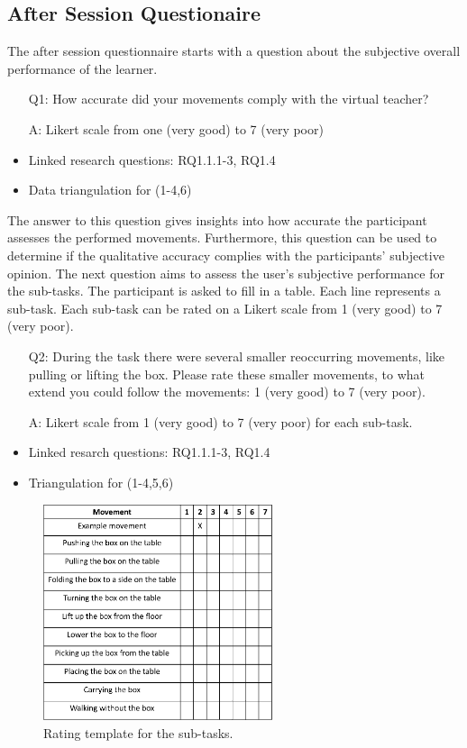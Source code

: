 \subsection{After Session Questionaire}
The after session questionnaire starts with a question about the subjective overall performance of the learner. 
\begin{itemize}
	\item[Q1:] How accurate did your movements comply with the virtual teacher?
	\item[A:] Likert scale from one (very good) to 7 (very poor)
	\item Linked research questions: RQ1.1.1-3, RQ1.4
	\item Data triangulation for (1-4,6)
\end{itemize}
The answer to this question gives insights into how accurate the participant assesses the performed movements. Furthermore, this question can be used to determine if the qualitative accuracy complies with the participants' subjective opinion. The next question aims to assess the user's subjective performance for the sub-tasks. The participant is asked to fill in a table. Each line represents a sub-task. Each sub-task can be rated on a Likert scale from 1 (very good) to 7 (very poor).
\begin{itemize}
	\item[Q2:] During the task there were several smaller reoccurring movements, like pulling or lifting the box. Please rate these smaller movements, to what extend you could follow the movements: 1 (very good) to 7 (very poor).
	\item[A:] Likert scale from 1 (very good) to 7 (very poor) for each sub-task.
	\item Linked resarch questions: RQ1.1.1-3, RQ1.4
	\item Triangulation for (1-4,5,6)
\end{itemize}
\begin{figure}[H]
	\centering
	\includegraphics[width=0.6\textwidth]{figures/sub-task-rating.png}
	\caption[Rating template for the sub-tasks]{Rating template for the sub-tasks.}
	\label{fig:subtaskrating}
\end{figure}

